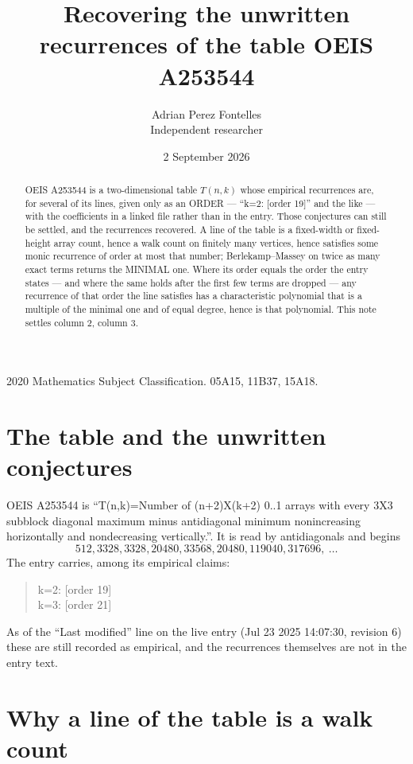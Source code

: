 \documentclass[11pt,a4paper]{article}
\title{Recovering the unwritten recurrences of the table OEIS A253544}
\author{Adrian Perez Fontelles\\ \small Independent researcher}
\date{2 September 2026}
\theoremstyle{plain}
\theoremstyle{definition}
\begin{document}
\maketitle

\begin{abstract}
OEIS A253544 is a two-dimensional table $T(n,k)$ whose empirical recurrences are, for several of
its lines, given only as an ORDER --- ``k=2: [order 19]'' and the like --- with the
coefficients in a linked file rather than in the entry. Those conjectures can still be settled,
and the recurrences recovered. A line of the table is a fixed-width or fixed-height array
count, hence a walk count on finitely many vertices, hence satisfies some monic recurrence of
order at most that number; Berlekamp--Massey on twice as many exact terms returns the MINIMAL
one. Where its order equals the order the entry states --- and where the same holds after the
first few terms are dropped --- any recurrence of that order the line satisfies has a
characteristic polynomial that is a multiple of the minimal one and of equal degree, hence is
that polynomial. This note settles column 2, column 3.
\end{abstract}

\noindent\small 2020 Mathematics Subject Classification. 05A15, 11B37, 15A18.\normalsize

\section{The table and the unwritten conjectures}

OEIS A253544 is ``T(n,k)=Number of (n+2)X(k+2) 0..1 arrays with every 3X3 subblock diagonal maximum minus antidiagonal minimum nonincreasing horizontally and nondecreasing vertically.''. It is read by antidiagonals and begins
\[
512, 3328, 3328, 20480, 33568, 20480, 119040, 317696,\ \dots
\]
The entry carries, among its empirical claims:
\begin{quote}\small
k=2: [order 19]\\
k=3: [order 21]
\end{quote}
As of the ``Last modified'' line on the live entry (Jul 23 2025 14:07:30, revision 6) these are still
recorded as empirical, and the recurrences themselves are not in the entry text.

\section{Why a line of the table is a walk count}
\end{document}
